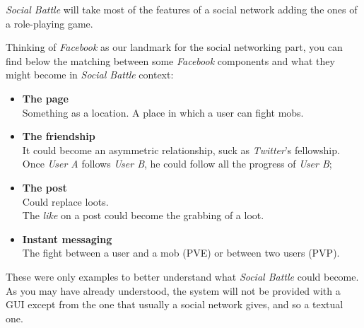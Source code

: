 		\textit{Social Battle} will take most of the features of a social network adding the 
		ones of a role-playing game.

		Thinking of \textit{Facebook} as our landmark for the social networking part, 
		you can find below the matching between some \textit{Facebook} components and what 
		they might become in \textit{Social Battle} context:
		\begin{itemize}
			\item \textbf{The page}\\
			Something as a location. A place in which a user can fight mobs.

			\item \textbf{The friendship}\\
			It could become an asymmetric relationship, suck as \textit{Twitter}'s fellowship.
			Once \textit{User A} follows \textit{User B}, he could follow all the progress
			of \textit{User B};

			\item \textbf{The post}\\
			Could replace loots.\\
			The \textit{like} on a post could become the grabbing of a loot.

			\item \textbf{Instant messaging}\\
			The fight between a user and a mob (PVE) or between two users (PVP).
		\end{itemize}

		These were only examples to better understand what \textit{Social Battle} could become.\\
		As you may have already understood, the system will not be provided with a GUI except from the one 
		that usually a social network gives, and so a textual one.

